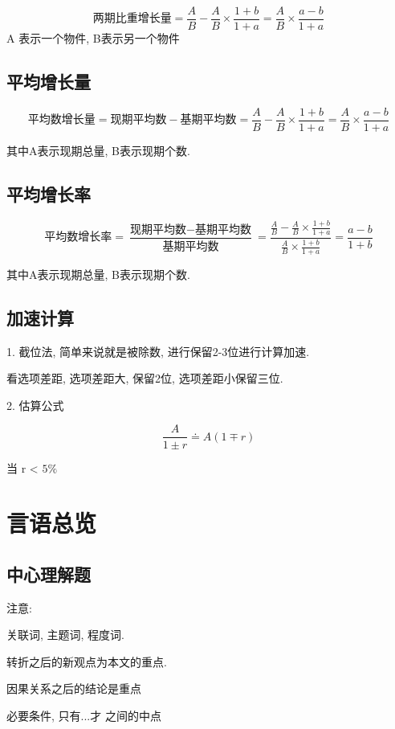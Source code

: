 \documentclass[UTF8]{ctexart}
\begin{document}
$$
	\mbox{两期比重增长量} = \frac{A}{B} - \frac{A}{B} \times \frac{1+b}{1+a} =
	\frac{A}{B} \times \frac{a-b}{1+a}
$$
A 表示一个物件, B表示另一个物件


\subsection{平均增长量}

$$
	\mbox{平均数增长量} = \mbox{现期平均数} - \mbox{基期平均数} = \frac{A}{B} - \frac{A}{B} \times \frac{1+b}{1+a} =
	\frac{A}{B} \times \frac{a-b}{1+a}
$$

其中A表示现期总量, B表示现期个数.

\subsection{平均增长率}

$$
	\mbox{平均数增长率} = \frac{\mbox{现期平均数} - \mbox{基期平均数}}{\mbox{基期平均数}} =
	\frac{\frac{A}{B}-\frac{A}{B} \times \frac{1+b}{1+a}}{\frac{A}{B} \times \frac{1+b}{1+a}} = \frac{a-b}{1+b}
$$

其中A表示现期总量, B表示现期个数.

\subsection{加速计算}
1. 截位法, 简单来说就是被除数, 进行保留2-3位进行计算加速.

看选项差距, 选项差距大, 保留2位, 选项差距小保留三位.

2. 估算公式

$$
	\frac{A}{1\pm r} \doteq A(1 \mp r)
$$

当 r < $5\%$




\section{言语总览}

\subsection{中心理解题}

注意:

关联词, 主题词, 程度词.

转折之后的新观点为本文的重点.

因果关系之后的结论是重点

必要条件, 只有...才 之间的中点
\end{document}
